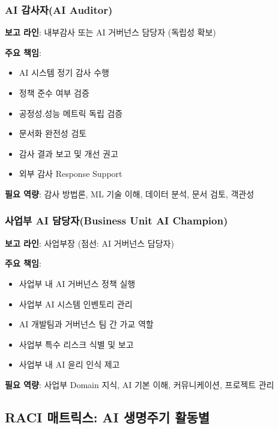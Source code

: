 \subsubsection{AI 감사자(AI Auditor)}

\textbf{보고 라인}: 내부감사 또는 AI 거버넌스 담당자 (독립성 확보)

\textbf{주요 책임}:
\begin{itemize}
 \item AI 시스템 정기 감사 수행
 \item 정책 준수 여부 검증
 \item 공정성.성능 메트릭 독립 검증
 \item 문서화 완전성 검토
 \item 감사 결과 보고 및 개선 권고
 \item 외부 감사 Response Support
\end{itemize}

\textbf{필요 역량}: 
감사 방법론, ML 기술 이해, 데이터 분석, 문서 검토, 객관성


\subsubsection{사업부 AI 담당자(Business Unit AI Champion)}

\textbf{보고 라인}: 사업부장 (점선: AI 거버넌스 담당자)

\textbf{주요 책임}:
\begin{itemize}
 \item 사업부 내 AI 거버넌스 정책 실행
 \item 사업부 AI 시스템 인벤토리 관리
 \item AI 개발팀과 거버넌스 팀 간 가교 역할
 \item 사업부 특수 리스크 식별 및 보고
 \item 사업부 내 AI 윤리 인식 제고
\end{itemize}

\textbf{필요 역량}: 
사업부 Domain 지식, AI 기본 이해, 커뮤니케이션, 프로젝트 관리


\subsection{RACI 매트릭스: AI 생명주기 활동별}
\label{sec:4.2.2}

